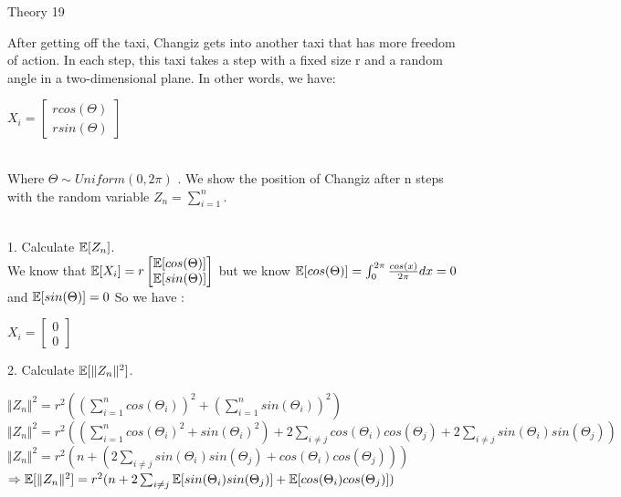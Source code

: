 \documentclass[30pt]{article}
\begin{document}
{\Large \color{blue} Theory 19 } \\
{\color{blue} After getting off the taxi, Changiz gets into another taxi that has more freedom of action. In each step, this taxi takes a step with a fixed size r and a random angle in a two-dimensional plane. In other words, we have: \\
\begin{center}
    $X_i = \begin{bmatrix}
    rcos(\Theta) \\ r sin(\Theta)
    \end{bmatrix}$ 
\end{center} \\
Where $\Theta \sim Uniform(0,2\pi) $ . We show the position of Changiz after n steps with the random variable $Z_n = \sum_{i=1}^{n} $.
} \\ \newline 
{\color{blue} {\large 1.} Calculate $\Bbb{E}[Z_n] $. } \\ \newline
We know that $\Bbb{E}[X_i] = r \begin{bmatrix}
    \Bbb{E}[cos(\Theta)] \\ \Bbb{E}[sin(\Theta)]
    \end{bmatrix} $ but we know $\Bbb{E}[cos(\Theta)] = \int_{0}^{2\pi} \frac{cos(x)}{2\pi}dx = 0 $ and $\Bbb{E}[sin(\Theta)] = 0 $ So we have : \begin{center}
        $X_i = \begin{bmatrix}
    0 \\ 0
    \end{bmatrix}$
    \end{center}  
{\color{blue} {\large 2.} Calculate $\Bbb{E}[\Vert Z_n\Vert^2] $. } \\ \newline
\begin{center}
    $\Vert Z_n \Vert^2 = r^2 ((\sum_{i=1}^{n}cos(\Theta_i) )^2 +(\sum_{i=1}^{n}sin(\Theta_i) )^2 ) $ \vspace{0.25cm}\\
    $\Vert Z_n \Vert^2 = r^2 ((\sum_{i=1}^{n}cos(\Theta_i)^2 +sin(\Theta_i)^2 ) + 2\sum_{i\neq j}cos(\Theta_i)cos(\Theta_j) +2\sum_{i\neq j}sin(\Theta_i)sin(\Theta_j) ) $ \vspace{0.25cm} \\ 
    $\Vert Z_n \Vert^2 = r^2 (n +(2\sum_{i\neq j}sin(\Theta_i)sin(\Theta_j) + cos(\Theta_i)cos(\Theta_j) ) ) $ \vspace{0.25cm} \\
    $\Rightarrow \Bbb{E}[\Vert Z_n\Vert^2] = r^2 (n + 2\sum_{i\neq j}\Bbb{E}[sin(\Theta_i)sin(\Theta_j)] + \Bbb{E}[cos(\Theta_i)cos(\Theta_j)] ) $ 
\end{center} \\
\end{document}
